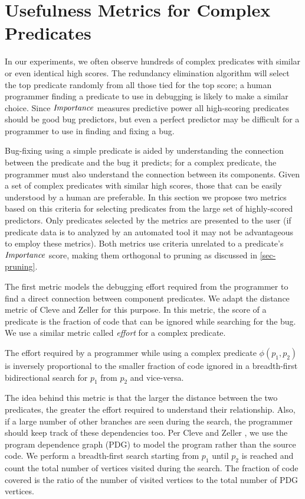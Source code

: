 
\section{Usefulness Metrics for Complex Predicates}
\label{sec-metrics}
In our experiments, we often observe hundreds of complex predicates with similar or even identical high scores.  The redundancy elimination algorithm will select the top predicate randomly from all those tied for the top score; a human programmer finding a predicate to use in debugging is likely to make a similar choice.  Since $\mathit{Importance}$ measures predictive power all high-scoring predicates should be good bug predictors, but even a perfect predictor may be difficult for a programmer to use in finding and fixing a bug.

Bug-fixing using a simple predicate is aided by understanding the connection between the predicate and the bug it predicts; for a complex predicate, the programmer must also understand the connection between its components.  Given a set of complex predicates with similar high scores, those that can be easily understood by a human are preferable.  In this section we propose two metrics based on this criteria for selecting predicates from the large set of highly-scored predictors.  Only predicates selected by the metrics are presented to the user (if predicate data is to analyzed by an automated tool it may not be advantageous to employ these metrics).  Both metrics use criteria unrelated to a predicate's $\mathit{Importance}$ score, making them orthogonal to pruning as discussed in \autoref{sec-pruning}.

The first metric models the debugging effort required from the programmer to find a direct connection between component predicates.  We adapt the distance metric of Cleve and Zeller \cite{1062522} for this purpose.  In this metric, the score of a predicate is the fraction of code that can be ignored while searching for the bug.  We use a similar metric called \emph{effort} for a complex predicate.

\begin{defn}
\label{def-effort}
The effort required by a programmer while using a complex predicate $\phi(p_1, p_2)$ is inversely proportional to the smaller fraction of code ignored in a breadth-first bidirectional search for $p_1$ from $p_2$ and vice-versa.
\end{defn}

The idea behind this metric is that the larger the distance between the two predicates, the greater the effort required to understand their relationship.  Also, if a large number of other branches are seen during the search, the programmer should keep track of these dependencies too.  Per Cleve and Zeller \cite{1062522}, we use the program dependence graph (PDG) to model the program rather than the source code. We perform a breadth-first search starting from $p_1$ until $p_2$ is reached and count the total number of vertices visited during the search. The fraction of code covered is the ratio of the number of visited vertices to the total number of PDG vertices. 


